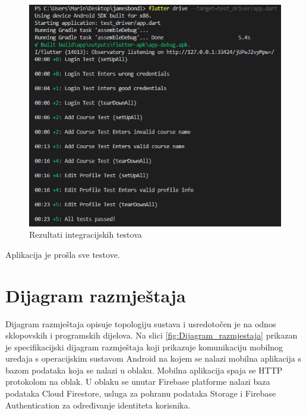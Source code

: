 			\begin{figure}[h]
				\includegraphics[scale=0.4]{slike/integTests.PNG}
				\centering
				\caption{Rezultati integracijskih testova}
				\label{fig:integTests}
			\end{figure}
			
			Aplikacija je prošla sve testove.
			
			\eject 
		
		
		\section{Dijagram razmještaja}
			
			Dijagram razmještaja opisuje topologiju sustava i usredotočen je na odnos sklopovskih i programskih dijelova. Na slici \ref{fig:Dijagram_razmjestaja} prikazan je specifikacijski dijagram razmještaja koji prikazuje komunikaciju mobilnog uređaja s operacijskim sustavom Android na kojem se nalazi mobilna aplikacija s bazom podataka koja se nalazi u oblaku. Mobilna aplikacija spaja se HTTP protokolom na oblak. U oblaku se unutar Firebase platforme nalazi baza podataka Cloud Firestore, usluga za pohranu podataka Storage i Firebase Authentication za određivanje identiteta korisnika.
			
